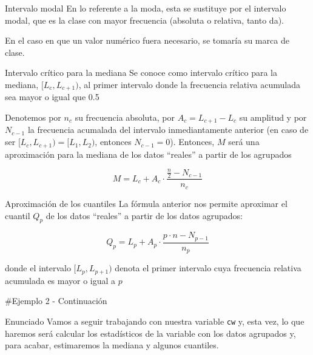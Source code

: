\documentclass[
  ignorenonframetext,
]{beamer}
\begin{document}
\begin{frame}{Intervalo modal}
\protect\hypertarget{intervalo-modal}{}
En lo referente a la moda, esta se sustituye por el intervalo modal, que
es la clase con mayor frecuencia (absoluta o relativa, tanto da).

En el caso en que un valor numérico fuera necesario, se tomaría su marca
de clase.
\end{frame}

\begin{frame}{Intervalo crítico para la mediana}
\protect\hypertarget{intervalo-cruxedtico-para-la-mediana}{}
Se conoce como intervalo crítico para la mediana, \([L_c,L_{c+1})\), al
primer intervalo donde la frecuencia relativa acumulada sea mayor o
igual que 0.5

Denotemos por \(n_c\) su frecuencia absoluta, por \(A_c = L_{c+1}-L_c\)
su amplitud y por \(N_{c-1}\) la frecuencia acumalada del intervalo
inmediantamente anterior (en caso de ser \([L_c,L_{c+1})=[L_1,L_2)\),
entonces \(N_{c-1}=0\)). Entonces, \(M\) será una aproximación para la
mediana de los datos ``reales'' a partir de los agrupados

\[M = L_c +A_c\cdot\frac{\frac{n}{2}-N_{c-1}}{n_c}\]
\end{frame}

\begin{frame}{Aproximación de los cuantiles}
\protect\hypertarget{aproximaciuxf3n-de-los-cuantiles}{}
La fórmula anterior nos permite aproximar el cuantil \(Q_p\) de los
datos ``reales'' a partir de los datos agrupados:

\[Q_p = L_p +A_p\cdot\frac{p\cdot n-N_{p-1}}{n_p}\]

donde el intervalo \([L_p,L_{p+1})\) denota el primer intervalo cuya
frecuencia relativa acumulada es mayor o igual a \(p\)

\#Ejemplo 2 - Continuación
\end{frame}

\begin{frame}[fragile]{Enunciado}
\protect\hypertarget{enunciado-3}{}
Vamos a seguir trabajando con nuestra variable \texttt{cw} y, esta vez,
lo que haremos será calcular los estadísticos de la variable con los
datos agrupados y, para acabar, estimaremos la mediana y algunos
cuantiles.
\end{frame}
\end{document}
